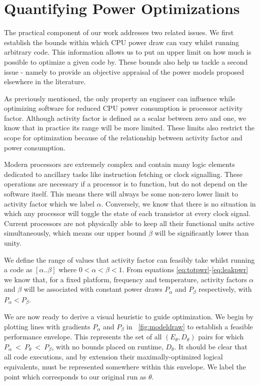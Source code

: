 \section{Quantifying Power Optimizations}
\label{sec:quantifying}

The practical component of our work addresses two related issues. We first establish the bounds within which CPU power draw can vary whilst running arbitrary code. This information allows us to put an upper limit on how much is possible to optimize a given code by. These bounds also help us tackle a second issue - namely to provide an objective appraisal of the power models proposed elsewhere in the literature.

As previously mentioned, the only property an engineer can influence while optimizing software for reduced CPU power consumption is processor activity factor. Although activity factor is defined as a scalar between zero and one, we know that in practice its range will be more limited. These limits also restrict the scope for optimization because of the relationship between activity factor and power consumption.

Modern processors are extremely complex and contain many logic elements dedicated to ancillary tasks like instruction fetching or clock signalling. These operations are necessary if a processor is to function, but do not depend on the software itself. This means there will always be some non-zero lower limit to activity factor which we label $\alpha$. Conversely, we know that there is no situation in which any processor will toggle the state of each transistor at every clock signal. Current processors are not physically able to keep all their functional units active simultaneously, which means our upper bound $\beta$ will be significantly lower than unity.

We define the range of values that activity factor can feasibly take whilst running a code as $[\alpha  .. \beta]$ where $0 < \alpha < \beta < 1$. From equations \ref{eq:totpwr}-\ref{eq:leakpwr} we know that, for a fixed platform, frequency and temperature, activity factors $\alpha$ and $\beta$ will be associated with constant power draws $P_{\alpha}$ and $P_{\beta}$ respectively, with $P_{\alpha} < P_{\beta}$.

We are now ready to derive a visual heuristic to guide optimization. We begin by plotting lines with gradients $P_{\alpha}$ and $P_{\beta}$ in \figurename~\ref{fig:modeldraw} to establish a feasible performance envelope. This represents the set of all $(E_\theta, D_\theta)$ pairs for which $P_{\alpha}~<~P_\theta~<~P_{\beta}$, with no bounds placed on runtime, $D_\theta$. It should be clear that all code executions, and by extension their maximally-optimized logical equivalents, must be represented somewhere within this envelope. We label the point which corresponds to our original run as $\theta$.

